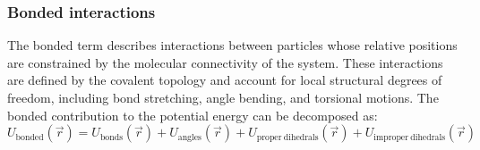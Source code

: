 \subsubsection{Bonded interactions}
The bonded term describes interactions between particles whose relative positions are constrained by the molecular connectivity of the system. These interactions are defined by the covalent topology and account for local structural degrees of freedom, including bond stretching, angle bending, and torsional motions. The bonded contribution to the potential energy can be decomposed as:
\begin{equation}
U_{\mathrm{bonded}}(\vec{r}) =
U_{\mathrm{bonds}}(\vec{r}) +
U_{\mathrm{angles}}(\vec{r}) +
U_{\mathrm{proper\ dihedrals}}(\vec{r}) +
U_{\mathrm{improper\ dihedrals}}(\vec{r})
\end{equation}



